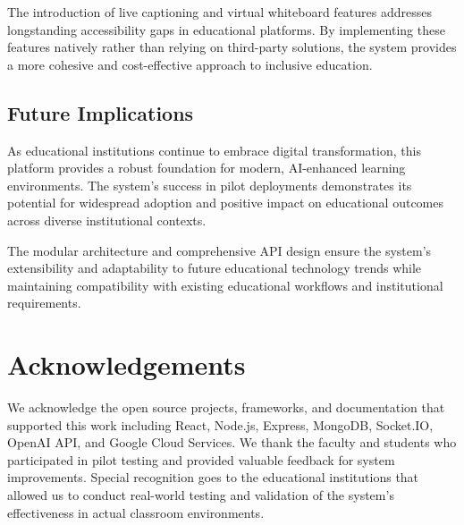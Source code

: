 \documentclass[onecolumn]{IEEEtran}
\begin{document}
The introduction of live captioning and virtual whiteboard features addresses longstanding accessibility gaps in educational platforms. By implementing these features natively rather than relying on third-party solutions, the system provides a more cohesive and cost-effective approach to inclusive education.

\subsection{Future Implications}

As educational institutions continue to embrace digital transformation, this platform provides a robust foundation for modern, AI-enhanced learning environments. The system's success in pilot deployments demonstrates its potential for widespread adoption and positive impact on educational outcomes across diverse institutional contexts.

The modular architecture and comprehensive API design ensure the system's extensibility and adaptability to future educational technology trends while maintaining compatibility with existing educational workflows and institutional requirements.

\section*{Acknowledgements}

We acknowledge the open source projects, frameworks, and documentation that supported this work including React, Node.js, Express, MongoDB, Socket.IO, OpenAI API, and Google Cloud Services. We thank the faculty and students who participated in pilot testing and provided valuable feedback for system improvements. Special recognition goes to the educational institutions that allowed us to conduct real-world testing and validation of the system's effectiveness in actual classroom environments.
\end{document}
